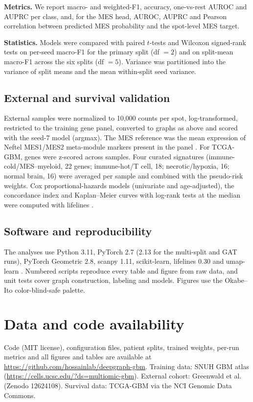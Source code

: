 \documentclass[11pt,letterpaper]{article}
\begin{document}
\textbf{Metrics.} We report macro- and weighted-F1, accuracy, one-vs-rest AUROC and AUPRC per class, and, for the MES head, AUROC, AUPRC and Pearson correlation between predicted MES probability and the spot-level MES target.

\textbf{Statistics.} Models were compared with paired $t$-tests and Wilcoxon signed-rank tests on per-seed macro-F1 for the primary split (df $= 2$) and on split-mean macro-F1 across the six splits (df $= 5$). Variance was partitioned into the variance of split means and the mean within-split seed variance.

\subsection{External and survival validation}

External samples were normalized to 10{,}000 counts per spot, log-transformed, restricted to the training gene panel, converted to graphs as above and scored with the seed-7 model (argmax). The MES reference was the mean expression of Neftel MES1/MES2 meta-module markers present in the panel \cite{neftel2019}. For TCGA-GBM, genes were z-scored across samples. Four curated signatures (immune-cold/MES--myeloid, 22 genes; immune-hot/T cell, 18; necrotic/hypoxia, 16; normal brain, 16) were averaged per sample and combined with the pseudo-risk weights. Cox proportional-hazards models (univariate and age-adjusted), the concordance index and Kaplan--Meier curves with log-rank tests at the median were computed with lifelines \cite{davidsonpilon2019}.

\subsection{Software and reproducibility}

The analyses use Python 3.11, PyTorch 2.7 (2.13 for the multi-split and GAT runs), PyTorch Geometric 2.8, scanpy 1.11, scikit-learn, lifelines 0.30 and umap-learn \cite{mcinnes2018}. Numbered scripts reproduce every table and figure from raw data, and unit tests cover graph construction, labeling and models. Figures use the Okabe--Ito color-blind-safe palette.

\section*{Data and code availability}
Code (MIT license), configuration files, patient splits, trained weights, per-run metrics and all figures and tables are available at \url{https://github.com/hossainlab/deepgraph-gbm}. Training data: SNUH GBM atlas \cite{park2026} (\url{https://cells.ucsc.edu/?ds=multiomic-gbm}). External cohort: Greenwald et al.\ \cite{greenwald2024} (Zenodo 12624108). Survival data: TCGA-GBM via the NCI Genomic Data Commons.
\end{document}
